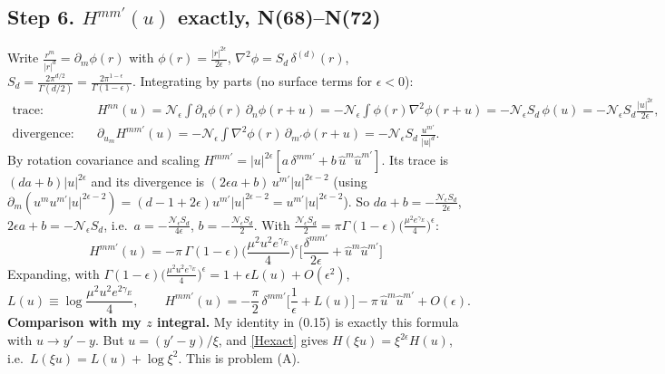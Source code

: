 \documentclass[10pt]{article}
\numberwithin{equation}{section}
\begin{document}
\subsection*{Step 6. $H^{mm'}(u)$ exactly, N(68)--N(72)}
Write $\frac{r^m}{|r|^d}=\partial_m\phi(r)$ with $\phi(r)=\frac{|r|^{2\epsilon}}{2\epsilon}$, $\nabla^2\phi=S_d\,\delta^{(d)}(r)$,
$S_d=\frac{2\pi^{d/2}}{\Gamma(d/2)}=\frac{2\pi^{1-\epsilon}}{\Gamma(1-\epsilon)}$. Integrating by parts (no surface terms for $\epsilon<0$):
\begin{align}
\text{trace:}&\quad H^{nn}(u)=\mathcal N_\epsilon\!\int\!\partial_n\phi(r)\,\partial_n\phi(r+u)=-\mathcal N_\epsilon\!\int\!\phi(r)\nabla^2\phi(r+u)=-\mathcal N_\epsilon S_d\,\phi(u)=-\mathcal N_\epsilon S_d\frac{|u|^{2\epsilon}}{2\epsilon},\\
\text{divergence:}&\quad \partial_{u_m}H^{mm'}(u)=-\mathcal N_\epsilon\!\int\!\nabla^2\phi(r)\,\partial_{m'}\phi(r+u)=-\mathcal N_\epsilon S_d\,\frac{u^{m'}}{|u|^d}.
\end{align}
By rotation covariance and scaling $H^{mm'}=|u|^{2\epsilon}[a\,\delta^{mm'}+b\,\hat u^m\hat u^{m'}]$. Its trace is
$(da+b)|u|^{2\epsilon}$ and its divergence is $(2\epsilon a+b)\,u^{m'}|u|^{2\epsilon-2}$ (using
$\partial_m(u^mu^{m'}|u|^{2\epsilon-2})=(d-1+2\epsilon)u^{m'}|u|^{2\epsilon-2}=u^{m'}|u|^{2\epsilon-2}$). So
$da+b=-\frac{\mathcal N_\epsilon S_d}{2\epsilon}$, $2\epsilon a+b=-\mathcal N_\epsilon S_d$, i.e.\ $a=-\frac{\mathcal N_\epsilon S_d}{4\epsilon}$,
$b=-\frac{\mathcal N_\epsilon S_d}{2}$. With $\frac{\mathcal N_\epsilon S_d}{2}=\pi\Gamma(1-\epsilon)\big(\frac{\mu^2e^{\gamma_E}}{4}\big)^\epsilon$:
\begin{equation}\label{Hexact}
\boxed{\;H^{mm'}(u)=-\pi\,\Gamma(1-\epsilon)\Big(\frac{\mu^2u^2e^{\gamma_E}}{4}\Big)^{\epsilon}\Big[\frac{\delta^{mm'}}{2\epsilon}+\hat u^m\hat u^{m'}\Big]\;}
\end{equation}
Expanding, with $\Gamma(1-\epsilon)\big(\frac{\mu^2u^2e^{\gamma_E}}{4}\big)^\epsilon=1+\epsilon L(u)+O(\epsilon^2)$,
\begin{equation}
L(u)\equiv\log\frac{\mu^2u^2e^{2\gamma_E}}{4},\qquad
H^{mm'}(u)=-\frac\pi2\,\delta^{mm'}\Big[\frac1\epsilon+L(u)\Big]-\pi\,\hat u^m\hat u^{m'}+O(\epsilon).
\end{equation}
\textbf{Comparison with my $z$ integral.} My identity in (0.15) is exactly this formula with $u\to y'-y$. But
$u=(y'-y)/\xi$, and \eqref{Hexact} gives $H(\xi u)=\xi^{2\epsilon}H(u)$, i.e.\ $L(\xi u)=L(u)+\log\xi^2$. This is problem (A).
\end{document}
